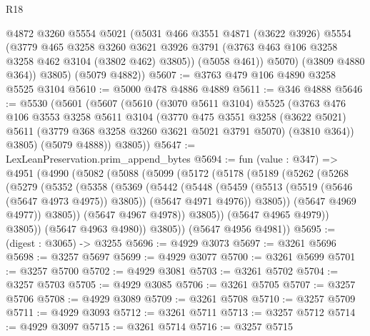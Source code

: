 \begin{lexlean}{R18}
\begin{coremodule}
            @4872
            @3260
            @5554
            @5021
            (@5031
              @466
              @3551
              @4871
              (@3622 @3926)
              @5554
              (@3779
                @465
                @3258
                @3260
                @3621
                @3926
                @3791
                (@3763 @463 @106 @3258 @3258 @462 @3104 (@3802 @462) @3805))
              (@5058 @461))
            @5070)
          (@3809 @4880 @364))
        @3805)
      (@5079 @4882))
@5607 := @3763 @479 @106 @4890 @3258 @5525 @3104
@5610 := @5000 @478 @4886 @4889
@5611 := @346 @4888
@5646 := @5530
    (@5601
      (@5607
        (@5610
          (@3070 @5611 @3104)
          @5525
          (@3763
            @476
            @106
            @3553
            @3258
            @5611
            @3104
            (@3770
              @475
              @3551
              @3258
              (@3622 @5021)
              @5611
              (@3779 @368 @3258 @3260 @3621 @5021 @3791 @5070)
              (@3810 @364))
            @3805)
          (@5079 @4888))
        @3805))
@5647 := LexLeanPreservation.prim_append_bytes
@5694 := fun (value : @347) =>
  @4951
    (@4990
      (@5082
        (@5088
          (@5099
            (@5172
              (@5178
                (@5189
                  (@5262
                    (@5268
                      (@5279
                        (@5352
                          (@5358
                            (@5369
                              (@5442
                                (@5448
                                  (@5459
                                    (@5513 (@5519 (@5646 (@5647 @4973 @4975)) @3805))
                                    (@5647 @4971 @4976))
                                  @3805))
                              (@5647 @4969 @4977))
                            @3805))
                        (@5647 @4967 @4978))
                      @3805))
                  (@5647 @4965 @4979))
                @3805))
            (@5647 @4963 @4980))
          @3805))
      (@5647 @4956 @4981))
@5695 := (digest : @3065) -> @3255
@5696 := @4929 @3073
@5697 := @3261 @5696
@5698 := @3257 @5697
@5699 := @4929 @3077
@5700 := @3261 @5699
@5701 := @3257 @5700
@5702 := @4929 @3081
@5703 := @3261 @5702
@5704 := @3257 @5703
@5705 := @4929 @3085
@5706 := @3261 @5705
@5707 := @3257 @5706
@5708 := @4929 @3089
@5709 := @3261 @5708
@5710 := @3257 @5709
@5711 := @4929 @3093
@5712 := @3261 @5711
@5713 := @3257 @5712
@5714 := @4929 @3097
@5715 := @3261 @5714
@5716 := @3257 @5715

\end{coremodule}
\end{lexlean}
